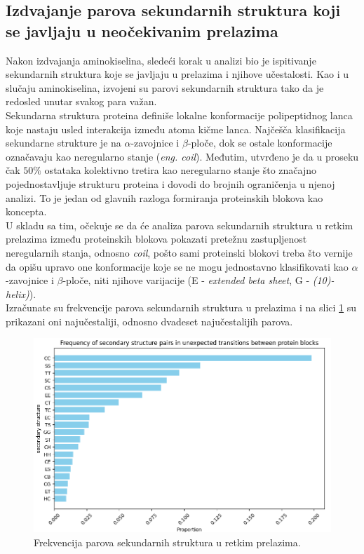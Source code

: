 \documentclass[a4paper,12pt]{article}
\begin{document}
\subsection{Izdvajanje parova sekundarnih struktura koji se javljaju u neočekivanim prelazima}
Nakon izdvajanja aminokiselina, sledeći korak u analizi bio je ispitivanje sekundarnih struktura koje se javljaju u prelazima i njihove učestalosti. Kao i u slučaju aminokiselina, izvojeni su parovi sekundarnih struktura tako da je redosled unutar svakog para važan. \\
Sekundarna struktura proteina definiše lokalne konformacije polipeptidnog lanca koje nastaju usled interakcija između atoma kičme lanca. Najčešča klasifikacija sekundarne strukture je na $\alpha$-zavojnice i $\beta$-ploče, dok se ostale konformacije označavaju kao neregularno stanje (\textit{eng. coil}). Međutim, utvrđeno je da u proseku čak $50\%$ ostataka \cite{debrevern2010proteinblocks} kolektivno tretira kao neregularno stanje što značajno pojednostavljuje strukturu proteina i dovodi do brojnih ograničenja u njenoj analizi. To je jedan od glavnih razloga formiranja proteinskih blokova kao koncepta. \\ 
U skladu sa tim, očekuje se da će analiza parova sekundarnih struktura u retkim prelazima između proteinskih blokova pokazati pretežnu zastupljenost neregularnih stanja, odnosno \textit{coil}, pošto sami proteinski blokovi treba što vernije da opišu upravo one konformacije koje se ne mogu jednostavno klasifikovati kao $\alpha$-zavojnice i $\beta$-ploče, niti njihove varijacije (E - \textit{extended beta sheet}, G - \textit{(10)-helix)}). \\
Izračunate su frekvencije parova sekundarnih struktura u prelazima i na slici \ref{Slika:s2freq} su prikazani oni najučestaliji, odnosno dvadeset najučestalijih parova.
\begin{figure}[htbp]
    \centering
    \includegraphics[width=1\textwidth]{./images/s2freq.png}
    \caption{Frekvencija parova sekundarnih struktura u retkim prelazima.}
    \label{Slika:s2freq}
\end{figure}
\end{document}
